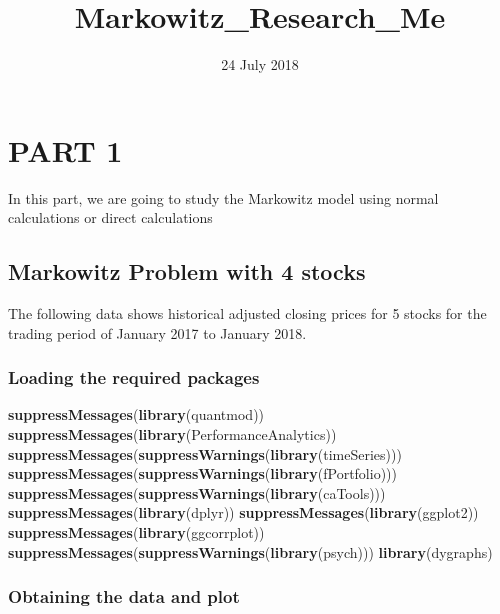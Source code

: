 \documentclass[]{article}
\title{Markowitz\_Research\_Me}
\author{}
\date{24 July 2018}
\newenvironment{Shaded}{\begin{snugshade}}{\end{snugshade}}
\newcommand{\KeywordTok}[1]{\textcolor[rgb]{0.13,0.29,0.53}{\textbf{#1}}}
\newcommand{\NormalTok}[1]{#1}
\begin{document}
\maketitle

\section{PART 1}\label{part-1}

In this part, we are going to study the Markowitz model using normal
calculations or direct calculations

\subsection{Markowitz Problem with 4
stocks}\label{markowitz-problem-with-4-stocks}

The following data shows historical adjusted closing prices for 5 stocks
for the trading period of January 2017 to January 2018.

\subsubsection{Loading the required
packages}\label{loading-the-required-packages}

\begin{Shaded}
\begin{Highlighting}[]
\KeywordTok{suppressMessages}\NormalTok{(}\KeywordTok{library}\NormalTok{(quantmod))}
\KeywordTok{suppressMessages}\NormalTok{(}\KeywordTok{library}\NormalTok{(PerformanceAnalytics))}
\KeywordTok{suppressMessages}\NormalTok{(}\KeywordTok{suppressWarnings}\NormalTok{(}\KeywordTok{library}\NormalTok{(timeSeries)))}
\KeywordTok{suppressMessages}\NormalTok{(}\KeywordTok{suppressWarnings}\NormalTok{(}\KeywordTok{library}\NormalTok{(fPortfolio)))}
\KeywordTok{suppressMessages}\NormalTok{(}\KeywordTok{suppressWarnings}\NormalTok{(}\KeywordTok{library}\NormalTok{(caTools)))}
\KeywordTok{suppressMessages}\NormalTok{(}\KeywordTok{library}\NormalTok{(dplyr))}
\KeywordTok{suppressMessages}\NormalTok{(}\KeywordTok{library}\NormalTok{(ggplot2))}
\KeywordTok{suppressMessages}\NormalTok{(}\KeywordTok{library}\NormalTok{(ggcorrplot))}
\KeywordTok{suppressMessages}\NormalTok{(}\KeywordTok{suppressWarnings}\NormalTok{(}\KeywordTok{library}\NormalTok{(psych)))}
\KeywordTok{library}\NormalTok{(dygraphs)}
\end{Highlighting}
\end{Shaded}

\subsubsection{Obtaining the data and
plot}\label{obtaining-the-data-and-plot}
\end{document}
